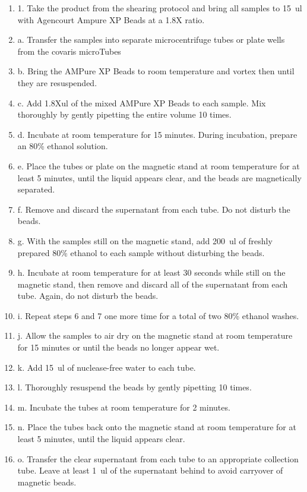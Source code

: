 \documentclass[graybox]{svmult}
\begin{document}
\begin{enumerate}
\item{1.      Take the product from the shearing protocol and bring all samples to 15~ul with Agencourt Ampure XP Beads at a 1.8X ratio.}
\item{a.      Transfer the samples into separate microcentrifuge tubes or plate wells from the covaris microTubes}
\item{b.      Bring the AMPure XP Beads to room temperature and vortex then until they are resuspended.}
\item{c.      Add 1.8Xul of the mixed AMPure XP Beads to each sample. Mix thoroughly by gently pipetting the entire volume 10 times.}
\item{d.      Incubate at room temperature for 15 minutes. During incubation, prepare an 80\% ethanol solution.}
\item{e.      Place the tubes or plate on the magnetic stand at room temperature for at least 5 minutes, until the liquid appears clear, and the beads are magnetically separated.}
\item{f.      Remove and discard the supernatant from each tube. Do not disturb the beads.}
\item{g.      With the samples still on the magnetic stand, add 200~ul of freshly prepared 80\% ethanol to each sample without disturbing the beads.}
\item{h.      Incubate at room temperature for at least 30 seconds while still on the magnetic stand, then remove and discard all of the supernatant from each tube. Again, do not disturb the beads.}
\item{i.      Repeat steps 6 and 7 one more time for a total of two 80\% ethanol washes.}
\item{j.      Allow the samples to air dry on the magnetic stand at room temperature for 15 minutes or until the beads no longer appear wet.}
\item{k.      Add 15~ul of nuclease-free water to each tube.}
\item{l.      Thoroughly resuspend the beads by gently pipetting 10 times.}
\item{m.      Incubate the tubes at room temperature for 2 minutes.}
\item{n.      Place the tubes back onto the magnetic stand at room temperature for at least 5 minutes, until the liquid appears clear.}
\item{o.      Transfer the clear supernatant from each tube to an appropriate collection tube. Leave at least 1~ul of the supernatant behind to avoid carryover of magnetic beads.}

\end{enumerate}
\end{document}
